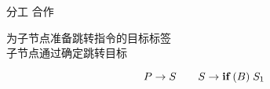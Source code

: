 
\begin{frame}{}
  \begin{center}
  \end{center}
\end{frame}

\begin{frame}
\end{frame}

\begin{frame}{}
  \begin{center}
    {\Large 分工 \qquad 合作}

    \vspace{0.20cm}
  \end{center}

  \pause
  \begin{center}
    为子节点准备跳转指令的目标标签 \\[5pt]
    子节点通过确定跳转目标
  \end{center}

  \vspace{-0.30cm}
  \[
    P \to S \qquad S \to \texttt{\bf if}\; (B)\; S_{1}
  \]
\end{frame}

\begin{frame}{}
\end{frame}
